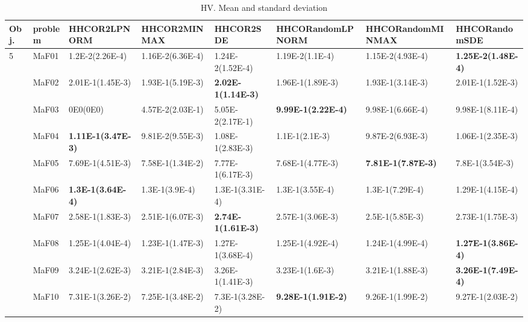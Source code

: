 \documentclass[]{article}
\begin{document}
\begin{landscape}
\begin{table}
\caption{HV. Mean and standard deviation}
\label{table:mean.HV}
\centering
\begin{footnotesize}
\begin{tabular}{|l|l|l|l|l|l|l|l|}
\hline
Obj. & problem  & HHCOR2LPNORM & HHCOR2MINMAX & HHCOR2SDE & HHCORandomLPNORM & HHCORandomMINMAX & HHCORandomSDE \\ \hline

\multirow{15}{*}{5} & MaF01 & 1.2E-2(2.26E-4) & 1.16E-2(6.36E-4) & \cellcolor{gray95} 1.24E-2(1.52E-4) & 1.19E-2(1.1E-4) & 1.15E-2(4.93E-4) & \cellcolor{gray95} {\bf 1.25E-2(1.48E-4)}\\
 & MaF02 & \cellcolor{gray95} 2.01E-1(1.45E-3) & 1.93E-1(5.19E-3) & \cellcolor{gray95} {\bf 2.02E-1(1.14E-3)} & 1.96E-1(1.89E-3) & 1.93E-1(3.14E-3) & \cellcolor{gray95} 2.01E-1(1.52E-3)\\
 & MaF03 & 0E0(0E0) & 4.57E-2(2.03E-1) & 5.05E-2(2.17E-1) & \cellcolor{gray95} {\bf 9.99E-1(2.22E-4)} & \cellcolor{gray95} 9.98E-1(6.66E-4) & \cellcolor{gray95} 9.98E-1(8.11E-4)\\
 & MaF04 & \cellcolor{gray95} {\bf 1.11E-1(3.47E-3)} & 9.81E-2(9.55E-3) & \cellcolor{gray95} 1.08E-1(2.83E-3) & \cellcolor{gray95} 1.1E-1(2.1E-3) & 9.87E-2(6.93E-3) & 1.06E-1(2.35E-3)\\
 & MaF05 & 7.69E-1(4.51E-3) & 7.58E-1(1.34E-2) & \cellcolor{gray95} 7.77E-1(6.17E-3) & 7.68E-1(4.77E-3) & \cellcolor{gray95} {\bf 7.81E-1(7.87E-3)} & \cellcolor{gray95} 7.8E-1(3.54E-3)\\
 & MaF06 & \cellcolor{gray95} {\bf 1.3E-1(3.64E-4)} & \cellcolor{gray95} 1.3E-1(3.9E-4) & 1.3E-1(3.31E-4) & \cellcolor{gray95} 1.3E-1(3.55E-4) & 1.3E-1(7.29E-4) & 1.29E-1(4.15E-4)\\
 & MaF07 & 2.58E-1(1.83E-3) & 2.51E-1(6.07E-3) & \cellcolor{gray95} {\bf 2.74E-1(1.61E-3)} & 2.57E-1(3.06E-3) & 2.5E-1(5.85E-3) & \cellcolor{gray95} 2.73E-1(1.75E-3)\\
 & MaF08 & 1.25E-1(4.04E-4) & 1.23E-1(1.47E-3) & \cellcolor{gray95} 1.27E-1(3.68E-4) & 1.25E-1(4.92E-4) & 1.24E-1(4.99E-4) & \cellcolor{gray95} {\bf 1.27E-1(3.86E-4)}\\
 & MaF09 & \cellcolor{gray95} 3.24E-1(2.62E-3) & 3.21E-1(2.84E-3) & \cellcolor{gray95} 3.26E-1(1.41E-3) & 3.23E-1(1.6E-3) & 3.21E-1(1.88E-3) & \cellcolor{gray95} {\bf 3.26E-1(7.49E-4)}\\
 & MaF10 & 7.31E-1(3.26E-2) & 7.25E-1(3.48E-2) & 7.3E-1(3.28E-2) & \cellcolor{gray95} {\bf 9.28E-1(1.91E-2)} & \cellcolor{gray95} 9.26E-1(1.99E-2) & \cellcolor{gray95} 9.27E-1(2.03E-2)\\

\end{tabular}
\end{footnotesize}
\end{table}
\end{landscape}
\end{document}

